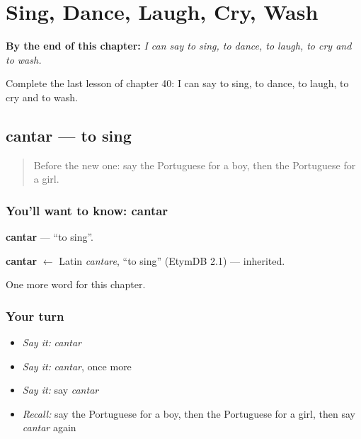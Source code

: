 
\chapter{Sing, Dance, Laugh, Cry, Wash}
\label{ch:pt-sing-dance-laugh-cry-wash}

\begin{chapteropening}
\textbf{By the end of this chapter:} \emph{I can say to sing, to dance, to laugh, to cry and to wash.}

Complete the last lesson of chapter 40: I can say to sing, to dance, to laugh, to cry and to wash.
\end{chapteropening}

\section[cantar]{cantar — to sing}

\label{lesson:PT-C40-cantar}



\begin{quote}
Before the new one: say the Portuguese for a boy, then the Portuguese for a girl.
\end{quote}

\subsection*{You'll want to know: cantar}
\textbf{cantar} — \textquotedblleft{}to sing\textquotedblright{}.

\begin{cousinweb}
\textbf{cantar} $\leftarrow$ Latin \emph{cantare}, \textquotedblleft{}to sing\textquotedblright{} (EtymDB 2.1) — inherited.
\end{cousinweb}

\begin{grammarlens}[title={What you've built}]
One more word for this chapter.
\end{grammarlens}

\subsection*{Your turn}
\begin{itemize}
\raggedright
  \item \emph{Say it:} \emph{cantar}
  \item \emph{Say it:} \emph{cantar}, once more
  \item \emph{Say it:} say \emph{cantar}
  \item \emph{Recall:} say the Portuguese for a boy, then the Portuguese for a girl, then say \emph{cantar} again
\end{itemize}

